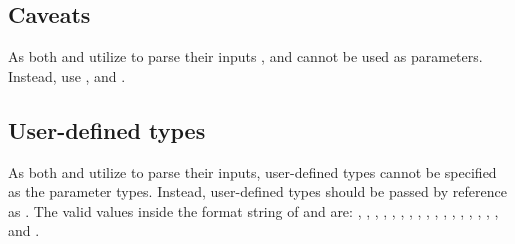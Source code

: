 \subsection{Caveats}
As both  and  utilize  to
parse their inputs ,  and  cannot be
used as parameters. Instead, use ,  and
.

\subsection{User-defined types}
As both  and  utilize  to
parse their inputs, user-defined types cannot be specified as the parameter
types. Instead, user-defined types should be passed by reference as
. The valid values inside the format string of 
and  are: , , ,
, , , ,
, , , ,
, , , ,
, ,  and .
